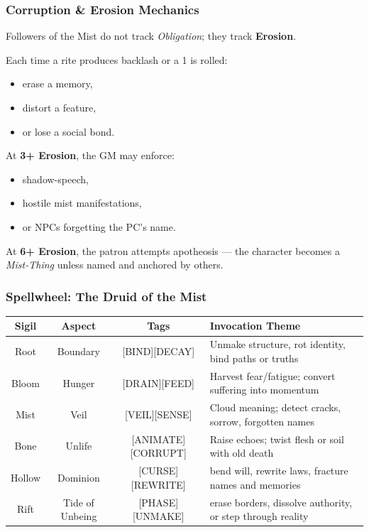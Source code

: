 \documentclass[11pt]{article}
\begin{document}
\subsubsection*{Corruption \& Erosion Mechanics}

Followers of the Mist do not track \emph{Obligation}; they track \textbf{Erosion}.

Each time a rite produces backlash or a 1 is rolled:
\begin{itemize}
  \item erase a memory,
  \item distort a feature,
  \item or lose a social bond.
\end{itemize}

At \textbf{3+ Erosion}, the GM may enforce:
\begin{itemize}
  \item shadow-speech,
  \item hostile mist manifestations,
  \item or NPCs forgetting the PC's name.
\end{itemize}

At \textbf{6+ Erosion}, the patron attempts apotheosis ---  
the character becomes a \emph{Mist-Thing} unless named and anchored by others.


\subsubsection{Spellwheel: The Druid of the Mist}
\label{spellwheel:mistrdruid}

\begin{center}
\begin{longtable}{|c|c|c|p{6cm}|}
\hline
\textbf{Sigil} & \textbf{Aspect} & \textbf{Tags} & \textbf{Invocation Theme} \\
\hline
Root & Boundary & [BIND][DECAY] &
Unmake structure, rot identity, bind paths or truths \\
\hline
Bloom & Hunger & [DRAIN][FEED] &
Harvest fear/fatigue; convert suffering into momentum \\
\hline
Mist & Veil & [VEIL][SENSE] &
Cloud meaning; detect cracks, sorrow, forgotten names \\
\hline
Bone & Unlife & [ANIMATE][CORRUPT] &
Raise echoes; twist flesh or soil with old death \\
\hline
Hollow & Dominion & [CURSE][REWRITE] &
bend will, rewrite laws, fracture names and memories \\
\hline
Rift & Tide of Unbeing & [PHASE][UNMAKE] &
erase borders, dissolve authority, or step through reality \\
\hline
\end{longtable}
\end{center}
\end{document}
